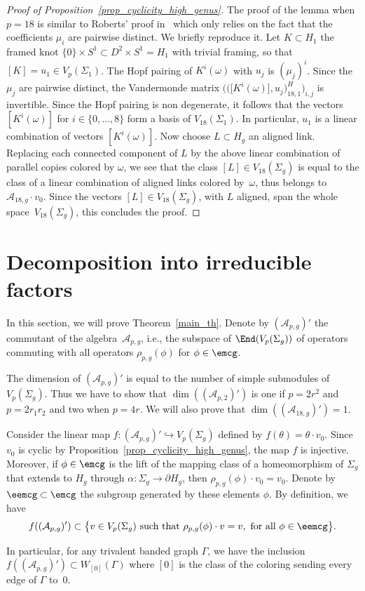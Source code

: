 \begin{proof}[Proof of Proposition~\ref{prop_cyclicity_high_genus}]
The proof of the lemma when $p=18$ is similar to Roberts' proof in~\cite{Ro} which only relies on the fact that the coefficients $\mu_i$ are pairwise distinct. We briefly reproduce it. Let $K\subset H_1$ the framed knot $\{0\}\times S^1 \subset D^2\times S^1=H_1$ with trivial framing, so that $[K]=u_1\in V_p(\Sigma_1)$. The Hopf pairing of $K^i(\omega)$ with $u_j$ is $(\mu_j)^i$. Since the $\mu_j$ are pairwise distinct, the Vandermonde matrix $\big(\big( \big[K^i(\omega)\big], u_j \big)_{18, 1}^H\big)_{i,j}$ is invertible. Since the Hopf pairing is non degenerate, it follows that the vectors $[K^i (\omega)]$ for $i\in \{0, \ldots, 8 \}$ form a basis of $V_{18}(\Sigma_1)$. In particular, $u_1$ is a linear combination of vectors $[K^i(\omega)]$. Now choose $L\subset H_g$ an aligned link. Replacing each connected component of $L$ by the above linear combination of parallel copies colored by $\omega$, we see that the class $[L]\in V_{18}(\Sigma_g)$ is equal to the class of a linear combination of aligned links colored by~$\omega$, thus belongs to $\mathcal{A}_{18,g}\cdot v_0$. Since the vectors $[L]\in V_{18}(\Sigma_g)$, with $L$ aligned, span the whole space~$V_{18}(\Sigma_g)$, this concludes the proof.
\end{proof}

\section{Decomposition into irreducible factors}

 In this section, we will prove Theorem~\ref{main_th}. Denote by $(\mathcal{A}_{p,g})'$ the commutant of the algebra~$\mathcal{A}_{p,g}$, i.e., the subspace of $\End(V_p(\Sigma_g))$ of operators commuting with all operators $\rho_{p,g}(\phi)$ for $\phi\in \emcg$.

The dimension of $(\mathcal{A}_{p,g})'$ is equal to the number of simple submodules of $V_p(\Sigma_g)$. Thus we have to show that $\dim( (\mathcal{A}_{p,2})')$ is one if $p=2r^2$ and $p=2r_1r_2$ and two when $p=4r$. We will also prove that $\dim( (\mathcal{A}_{18,g})')=1$.

Consider the linear map $f\colon (\mathcal{A}_{p,g})' \hookrightarrow V_p(\Sigma_g)$ defined by $f(\theta)= \theta\cdot v_0$. Since $v_0$ is cyclic by Proposition~\ref{prop_cyclicity_high_genus}, the map $f$ is injective. Moreover, if $\phi \in \emcg$ is the lift of the mapping class of a homeomorphism of $\Sigma_g$ that extends to $H_g$ through $\alpha \colon \Sigma_g \rightarrow \partial H_g$, then $ \rho_{p,g}(\phi)\cdot v_0 = v_0$. Denote by $\eemcg\subset \emcg$ the subgroup generated by these elements $\phi$. By definition, we have
\begin{gather*} f ( (\mathcal{A}_{p,g})' ) \subset \big\{ v\in V_p(\Sigma_g) \mbox{ such that } \rho_{p,g}(\phi)\cdot v = v, \mbox{ for all }\phi\in \eemcg \big\}.\end{gather*}

In particular, for any trivalent banded graph $\Gamma$, we have the inclusion $ f ( (\mathcal{A}_{p,g})' ) \subset W_{[0]}(\Gamma)$ where $[0]$ is the class of the coloring sending every edge of $\Gamma$ to~$0$.

